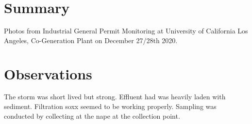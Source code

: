 \documentclass{article}
\begin{document}
\section*{Summary}

Photos from Industrial General Permit Monitoring at University of California Los
Angeles, Co-Generation Plant on December 27/28th 2020.

\section*{Observations}

The storm was short lived but strong.  Effluent had was heavily laden with
sediment.  Filtration soxx seemed to be working properly.  Sampling was
conducted by collecting at the nape at the collection point.

\newpage


\end{document}
